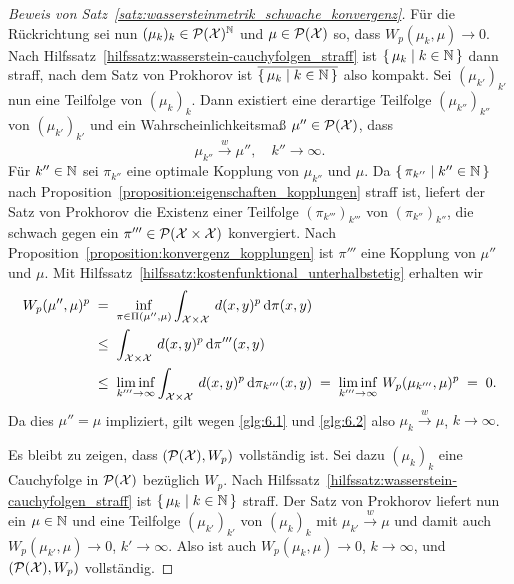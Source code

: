 \documentclass[../thesis/thesis.tex]{subfiles}
\begin{document}
\begin{proof}[Beweis von Satz~\ref{satz:wassersteinmetrik_schwache_konvergenz}]
		Für die Rückrichtung sei nun $(\mu_k)_k \in \mathcal{P}(\mathcal{X})^{\mathbb{N}}$ und $\mu \in \mathcal{P}(\mathcal{X})$ so, dass $W_p(\mu_k, \mu) \to 0$. Nach Hilfssatz~\ref{hilfssatz:wasserstein-cauchyfolgen_straff} ist $\left\{\, \mu_k \; \middle| \; k \in \mathbb{N} \,\right\}$ dann straff, nach dem Satz von Prokhorov ist $\overline{\left\{\, \mu_k \; \middle| \; k \in \mathbb{N} \,\right\}}$ also kompakt. Sei $(\mu_{k'})_{k'}$ nun eine Teilfolge von $(\mu_k)_k$. Dann existiert eine derartige Teilfolge $(\mu_{k''})_{k''}$ von $(\mu_{k'})_{k'}$ und ein Wahrscheinlichkeitsmaß $\mu'' \in \mathcal{P}(\mathcal{X})$, dass
		\[ \mu_{k''} \xrightarrow{w} \mu'', \quad k'' \to \infty \text{.} \label{glg:6.2} \tag{6.2} \]
		Für $k'' \in \mathbb{N}$ sei $\pi_{k''}$ eine optimale Kopplung von $\mu_{k''}$ und $\mu$. Da $\left\{\, \pi_{k''} \; \middle| \; k'' \in \mathbb{N} \,\right\}$ nach Proposition~\ref{proposition:eigenschaften_kopplungen} straff ist, liefert der Satz von Prokhorov die Existenz einer Teilfolge $(\pi_{k'''})_{k'''}$ von $(\pi_{k''})_{k''}$, die schwach gegen ein $\pi''' \in \mathcal{P}(\mathcal{X} \times \mathcal{X})$ konvergiert. Nach Proposition~\ref{proposition:konvergenz_kopplungen} ist $\pi'''$ eine Kopplung von $\mu''$ und $\mu$. Mit Hilfssatz~\ref{hilfssatz:kostenfunktional_unterhalbstetig} erhalten wir
		\begin{align*}
			W_p(\mu'', \mu)^p \; &= \; \inf_{\pi \in \Pi(\mu'', \mu)} \int_{\mathcal{X} \times \mathcal{X}} \, d(x, y)^p \, \mathrm{d}\pi(x, y) \\
			                \; &\leq \; \int_{\mathcal{X} \times \mathcal{X}} \, d(x, y)^p \, \mathrm{d}\pi'''(x, y) \\
			                \; &\leq \; \liminf_{k''' \to \infty} \int_{\mathcal{X} \times \mathcal{X}} \, d(x, y)^p \, \mathrm{d}\pi_{k'''}(x, y) \; = \; \liminf_{k''' \to \infty} \, W_p( \mu_{k'''}, \mu)^p \; = \; 0 \text{.}
		\end{align*}
		Da dies $\mu'' = \mu$ impliziert, gilt wegen \eqref{glg:6.1} und \eqref{glg:6.2} also
		$\mu_k \xrightarrow{w} \mu$, $k \to \infty$.
		
		Es bleibt zu zeigen, dass $(\mathcal{P}(\mathcal{X}), W_p)$ vollständig ist. Sei dazu $(\mu_k)_k$ eine Cauchyfolge in $\mathcal{P}(\mathcal{X})$ bezüglich $W_p$. Nach Hilfssatz~\ref{hilfssatz:wasserstein-cauchyfolgen_straff} ist 
		$\left\{\, \mu_k \; \middle| \; k \in \mathbb{N} \,\right\}$ straff. Der Satz von Prokhorov liefert nun ein $\mu \in \mathbb{N}$ und eine Teilfolge $(\mu_{k'})_{k'}$ von $(\mu_k)_k$ mit $\mu_{k'} \xrightarrow{w} \mu$ und damit auch
		$W_p(\mu_{k'}, \mu) \to 0$, $k' \to \infty$. Also ist auch $W_p(\mu_k, \mu) \to 0$, $k \to \infty$, und $(\mathcal{P}(\mathcal{X}), W_p)$ vollständig.
	\end{proof}
	
\end{document}
